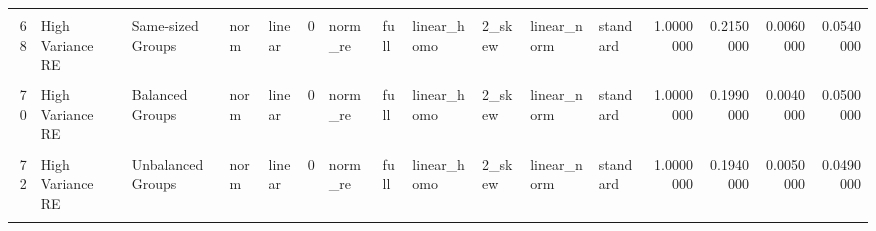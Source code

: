 \documentclass[12pt]{article}
\begin{document}
\begin{table}
{\begin{tabular}[t]{rllllrllllllrrrr}
\cellcolor{gray!6}{67} & \cellcolor{gray!6}{High Variance Error} & \cellcolor{gray!6}{Same-sized Groups} & \cellcolor{gray!6}{norm} & \cellcolor{gray!6}{linear} & \cellcolor{gray!6}{0} & \cellcolor{gray!6}{norm\_re} & \cellcolor{gray!6}{full} & \cellcolor{gray!6}{linear\_homo} & \cellcolor{gray!6}{2\_skew} & \cellcolor{gray!6}{linear\_norm} & \cellcolor{gray!6}{standard} & \cellcolor{gray!6}{1.0000000} & \cellcolor{gray!6}{0.6060000} & \cellcolor{gray!6}{0.6390000} & \cellcolor{gray!6}{0.0620000}\\
68 & High Variance RE & Same-sized Groups & norm & linear & 0 & norm\_re & full & linear\_homo & 2\_skew & linear\_norm & standard & 1.0000000 & 0.2150000 & 0.0060000 & 0.0540000\\
\cellcolor{gray!6}{69} & \cellcolor{gray!6}{High Variance Error} & \cellcolor{gray!6}{Balanced Groups} & \cellcolor{gray!6}{norm} & \cellcolor{gray!6}{linear} & \cellcolor{gray!6}{0} & \cellcolor{gray!6}{norm\_re} & \cellcolor{gray!6}{full} & \cellcolor{gray!6}{linear\_homo} & \cellcolor{gray!6}{2\_skew} & \cellcolor{gray!6}{linear\_norm} & \cellcolor{gray!6}{standard} & \cellcolor{gray!6}{1.0000000} & \cellcolor{gray!6}{0.5840000} & \cellcolor{gray!6}{0.5670000} & \cellcolor{gray!6}{0.0580000}\\
70 & High Variance RE & Balanced Groups & norm & linear & 0 & norm\_re & full & linear\_homo & 2\_skew & linear\_norm & standard & 1.0000000 & 0.1990000 & 0.0040000 & 0.0500000\\
\addlinespace
\cellcolor{gray!6}{71} & \cellcolor{gray!6}{High Variance Error} & \cellcolor{gray!6}{Unbalanced Groups} & \cellcolor{gray!6}{norm} & \cellcolor{gray!6}{linear} & \cellcolor{gray!6}{0} & \cellcolor{gray!6}{norm\_re} & \cellcolor{gray!6}{full} & \cellcolor{gray!6}{linear\_homo} & \cellcolor{gray!6}{2\_skew} & \cellcolor{gray!6}{linear\_norm} & \cellcolor{gray!6}{standard} & \cellcolor{gray!6}{1.0000000} & \cellcolor{gray!6}{0.5030000} & \cellcolor{gray!6}{0.5170000} & \cellcolor{gray!6}{0.0510000}\\
72 & High Variance RE & Unbalanced Groups & norm & linear & 0 & norm\_re & full & linear\_homo & 2\_skew & linear\_norm & standard & 1.0000000 & 0.1940000 & 0.0050000 & 0.0490000\\
\cellcolor{gray!6}{73} & \cellcolor{gray!6}{High Variance Error} & \cellcolor{gray!6}{Same-sized Groups} & \cellcolor{gray!6}{norm} & \cellcolor{gray!6}{linear} & \cellcolor{gray!6}{0} & \cellcolor{gray!6}{norm\_re} & \cellcolor{gray!6}{full} & \cellcolor{gray!6}{linear\_homo} & \cellcolor{gray!6}{4\_skew} & \cellcolor{gray!6}{linear\_norm} & \cellcolor{gray!6}{standard} & \cellcolor{gray!6}{1.0000000} & \cellcolor{gray!6}{0.6150000} & \cellcolor{gray!6}{0.6970000} & \cellcolor{gray!6}{0.0480000}\\

\end{tabular}}
\end{table}
\end{document}
